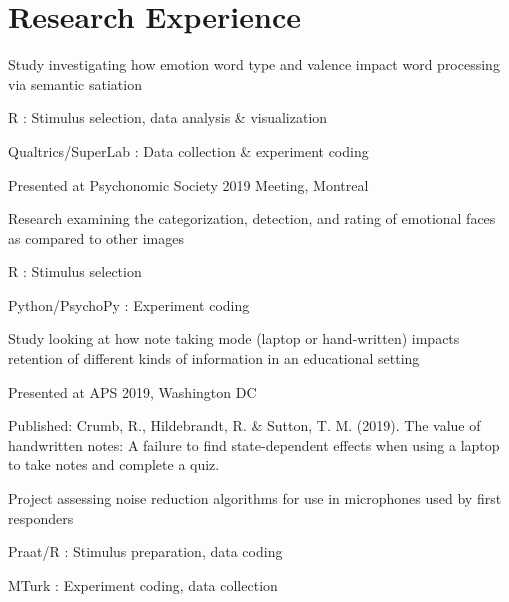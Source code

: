 \documentclass[letterpaper]{deedy-resume_sm}
\begin{document}
\section{Research Experience}
\begin{tightitemize}
\item Study investigating how emotion word type and valence impact word processing via semantic satiation
\item R : Stimulus selection, data analysis \& visualization
\item Qualtrics/SuperLab : Data collection \& experiment coding
\item Presented at Psychonomic Society 2019 Meeting, Montreal
\end{tightitemize}
\sectionspace

\begin{tightitemize}
\item Research examining the categorization, detection, and rating of emotional faces as compared to other images
\item R : Stimulus selection
\item Python/PsychoPy : Experiment coding
\end{tightitemize}
\sectionspace

\begin{tightitemize}
\item Study looking at how note taking mode (laptop or hand-written) impacts retention of different kinds of information in an educational setting
\item Presented at APS 2019, Washington DC
\item Published: Crumb, R., Hildebrandt, R. \& Sutton, T. M. (2019). The value of handwritten notes: A failure to find state-dependent effects when using a laptop to take notes and complete a quiz.
\end{tightitemize}
\sectionspace

\begin{tightitemize}
\item Project assessing noise reduction algorithms for use in microphones used by first responders
\item Praat/R : Stimulus preparation, data coding
\item MTurk : Experiment coding, data collection
\end{tightitemize}
\sectionspace
\end{document}
